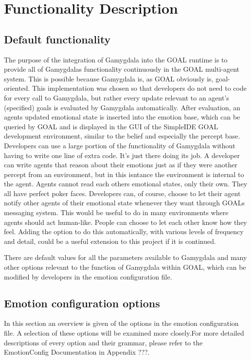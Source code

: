 \documentclass[11pt]{article}
\begin{document}
\section{Functionality Description}
\subsection{Default functionality}
The purpose of the integration of Gamygdala into the GOAL runtime is to provide all of Gamygdalas functionality continuously in the GOAL multi-agent system. This is possible because Gamygdala is, as GOAL obviously is, goal-oriented. This implementation was chosen so that developers do not need to code for every call to Gamygdala, but rather every update relevant to an agent's (specified) goals is evaluated by Gamygdala automatically. After evaluation, an agents updated emotional state is inserted into the emotion base, which can be queried by GOAL and is displayed in the GUI of the SimpleIDE GOAL development environment, similar to the belief and especially the percept base. Developers can use a large portion of the functionality of Gamygdala without having to write one line of extra code. It's just there doing its job. A developer can write agents that reason about their emotions just as if they were another percept from an environment, but in this isntance the environment is internal to the agent. Agents cannot read each others emotional states, only their own. They all have perfect poker faces. Developers can, of course, choose to let their agent notify other agents of their emotional state whenever they want through GOALs messaging system. This would be useful to do in many environments where agents should act human-like. People can choose to let each other know how they feel. Adding the option to do this automatically, with various levels of frequency and detail, could be a useful extension to this project if it is continued.

There are default values for all the parameters available to Gamygdala and many other options relevant to the function of Gamygdala within GOAL, which can be modified by developers in the emotion configuration file.


\subsection{Emotion configuration options}
In this section an overview is given of the options in the emotion configuration file. A selection of these options will be examined more closely.For more detailed descriptions of every option and their grammar, please refer to the EmotionConfig Documentation in Appendix ???. 
\end{document}

